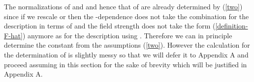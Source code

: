 \documentclass[a4paper,12pt]{article}
\begin{document}
The normalizations of \coordHE{} and \coordHE{}
and hence that of \coordHE{} are already determined by (\ref{two})
since if we rescale \coordHE{} or \coordHE{} then the \coordHE{}-dependence
does not take the combination \coordHE{} for the description
in terms of \coordHE{}
and the field strength \coordHE{} does not take the form
(\ref{definition-F-hat}) anymore
as for the description using \coordHE{}.
Therefore we can in principle determine the constant \coordHE{} from
the assumptions (\ref{two}).
However the calculation for the determination of \coordHE{} is
slightly messy so that
we will defer it to Appendix A
and proceed assuming \coordHE{} in this section
for the sake of brevity
which will be justified in Appendix A.
\end{document}
